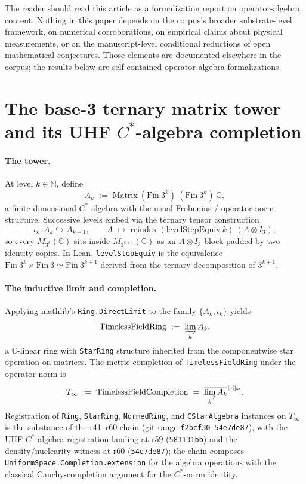 \documentclass[11pt,a4paper]{amsart}
\theoremstyle{plain}
\theoremstyle{definition}
\begin{document}
The reader should read this article as a formalization report on operator-algebra content. Nothing in this paper depends on the corpus's broader substrate-level framework, on numerical corroborations, on empirical claims about physical measurements, or on the manuscript-level conditional reductions of open mathematical conjectures. Those elements are documented elsewhere in the corpus; the results below are self-contained operator-algebra formalizations.

\section{The base-3 ternary matrix tower and its UHF $C^*$-algebra completion}\label{sec:tower}

\paragraph{The tower.} At level $k \in \mathbb{N}$, define
\[
A_k \;:=\; \mathrm{Matrix}~(\mathrm{Fin}~3^k)~(\mathrm{Fin}~3^k)~\mathbb{C},
\]
a finite-dimensional $C^*$-algebra with the usual Frobenius / operator-norm structure. Successive levels embed via the ternary tensor construction
\[
\iota_k \colon A_k \hookrightarrow A_{k+1}, \qquad A \;\longmapsto\; \mathrm{reindex}~(\mathrm{levelStepEquiv}~k)~(A \otimes I_3),
\]
so every $M_{3^k}(\mathbb{C})$ sits inside $M_{3^{k+1}}(\mathbb{C})$ as an $A \otimes I_3$ block padded by two identity copies. In Lean, \texttt{levelStepEquiv} is the equivalence $\mathrm{Fin}~3^k \times \mathrm{Fin}~3 \simeq \mathrm{Fin}~3^{k+1}$ derived from the ternary decomposition of $3^{k+1}$.

\paragraph{The inductive limit and completion.} Applying mathlib's \texttt{Ring.DirectLimit} to the family $\{A_k, \iota_k\}$ yields
\[
\mathrm{TimelessFieldRing} \;:=\; \varinjlim_k A_k,
\]
a $\mathbb{C}$-linear ring with \texttt{StarRing} structure inherited from the componentwise star operation on matrices. The metric completion of \texttt{TimelessFieldRing} under the operator norm is
\[
T_\infty \;:=\; \mathrm{TimelessFieldCompletion} \;=\; \overline{\varinjlim_k A_k}^{\|\cdot\|_{\textsf{op}}}.
\]
Registration of \texttt{Ring}, \texttt{StarRing}, \texttt{NormedRing}, and \texttt{CStarAlgebra} instances on $T_\infty$ is the substance of the r41--r60 chain (git range \texttt{f2bcf30}--\texttt{54e7de87}), with the UHF $C^*$-algebra registration landing at r59 (\texttt{581131bb}) and the density/nuclearity witness at r60 (\texttt{54e7de87}); the chain composes \texttt{UniformSpace.Completion.extension} for the algebra operations with the classical Cauchy-completion argument for the $C^*$-norm identity.
\end{document}
